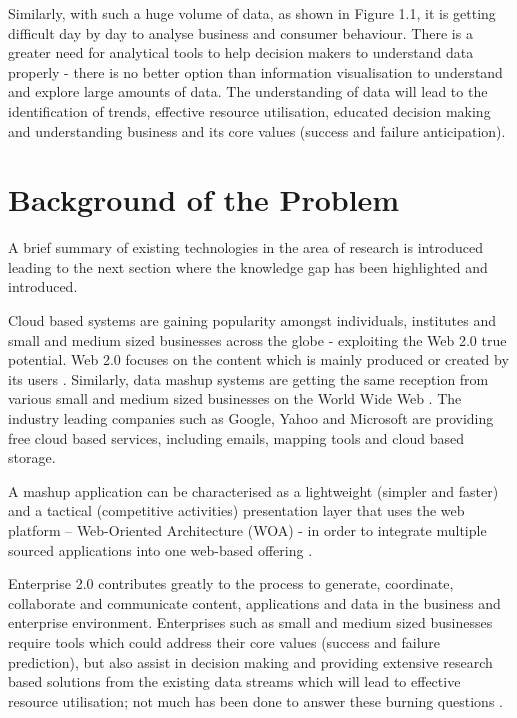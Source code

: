 Similarly, with such a huge volume of data, as shown in Figure 1.1, it is getting difficult day by day to analyse business and consumer behaviour. There is a greater need for analytical tools to help decision makers to understand data properly - there is no better option than information visualisation to understand and explore large amounts of data. The understanding of data will lead to the identification of trends, effective resource utilisation, educated decision making and understanding business and its core values (success and failure anticipation).

\section{Background of the Problem}

A brief summary of existing technologies in the area of research is introduced leading to the next section where the knowledge gap has been highlighted and introduced. 

Cloud based systems are gaining popularity amongst individuals, institutes and small and medium sized businesses across the globe - exploiting the Web 2.0 true potential. Web 2.0 focuses on the content which is mainly produced or created by its users \cite{3}. Similarly, data mashup systems are getting the same reception from various small and medium sized businesses on the World Wide Web \cite{patel2014enhance}. The industry leading companies such as Google, Yahoo and Microsoft are providing free cloud based services, including emails, mapping tools and cloud based storage. 

A mashup application can be characterised as a lightweight (simpler and faster) and a tactical (competitive activities) presentation layer that uses the web platform – Web-Oriented Architecture (WOA) - in order to integrate multiple sourced applications into one web-based offering \cite{4}.

Enterprise 2.0 contributes greatly to the process to generate, coordinate, collaborate and communicate content, applications and data in the business and enterprise environment. Enterprises such as small and medium sized businesses require tools which could address their core values (success and failure prediction), but also assist in decision making and providing extensive research based solutions from the existing data streams which will lead to effective resource utilisation;  not much has been done to answer these burning questions \cite{5}. 

